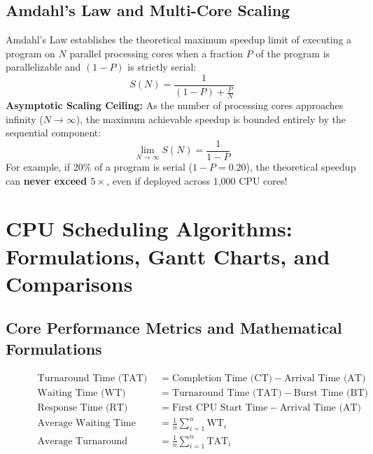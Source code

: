\subsection{Amdahl's Law and Multi-Core Scaling}
Amdahl's Law establishes the theoretical maximum speedup limit of executing a program on $N$ parallel processing cores when a fraction $P$ of the program is parallelizable and $(1 - P)$ is strictly serial:
\begin{equation}
\boxed{S(N) = \frac{1}{(1 - P) + \frac{P}{N}}}
\end{equation}
\textbf{Asymptotic Scaling Ceiling:} As the number of processing cores approaches infinity ($N \to \infty$), the maximum achievable speedup is bounded entirely by the sequential component:
\begin{equation}
\lim_{N \to \infty} S(N) = \frac{1}{1 - P}
\end{equation}
For example, if 20\% of a program is serial ($1 - P = 0.20$), the theoretical speedup can \textbf{never exceed $5\times$}, even if deployed across 1,000 CPU cores!

\section{CPU Scheduling Algorithms: Formulations, Gantt Charts, and Comparisons}
\label{sec:os_cpu_scheduling}

\subsection{Core Performance Metrics and Mathematical Formulations}
\begin{figure}[htbp]
\centering
\begin{tcolorbox}[colback=codebg, colframe=primary, title=\textbf{Standard CPU Scheduling Formulas}]
\begin{align}
\text{Turnaround Time (TAT)} &= \text{Completion Time (CT)} - \text{Arrival Time (AT)} \\
\text{Waiting Time (WT)} &= \text{Turnaround Time (TAT)} - \text{Burst Time (BT)} \\
\text{Response Time (RT)} &= \text{First CPU Start Time} - \text{Arrival Time (AT)} \\
\text{Average Waiting Time (AWT)} &= \frac{1}{n} \sum_{i=1}^{n} \text{WT}_i \\
\text{Average Turnaround Time (ATAT)} &= \frac{1}{n} \sum_{i=1}^{n} \text{TAT}_i
\end{align}
\end{tcolorbox}
\end{figure}

